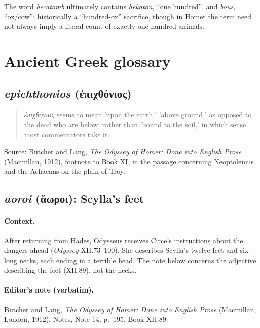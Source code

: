 The word \emph{hecatomb} ultimately contains \emph{hekaton}, ``one hundred'',
and \emph{bous}, ``ox/cow'': historically a ``hundred-ox'' sacrifice, though
in Homer the term need not always imply a literal count of exactly one
hundred animals.

\section{Ancient Greek glossary}
\label{section-ancient-greek-glossary}

\subsection{\emph{epichthonios} (ἐπιχθόνιος)}
\label{subsection-epichthonios}

\begin{quote}
\emph{ἐπιχθόνιος} seems to mean 'upon the earth,' 'above ground,' as opposed
to the dead who are below, rather than 'bound to the soil,' in which sense
most commentators take it.
\end{quote}

Source: Butcher and Lang, \emph{The Odyssey of Homer: Done into English
Prose} (Macmillan, 1912), footnote to Book XI, in the passage concerning
Neoptolemus and the Achaeans on the plain of Troy.
\subsection{\emph{aoroi} (ἄωροι): Scylla's feet}
\label{subsection-aoroi-scylla}

\paragraph{Context.} After returning from Hades, Odysseus receives Circe's
instructions about the dangers ahead (\emph{Odyssey} XII.73--100).
She describes Scylla's twelve feet and six long necks, each ending in a
terrible head. The note below concerns the adjective describing the feet
(XII.89), not the necks.

\paragraph{Editor's note (verbatim).} Butcher and Lang,
\emph{The Odyssey of Homer: Done into English Prose} (Macmillan, London,
1912), Notes, Note 14, p.~195, Book XII.89:

